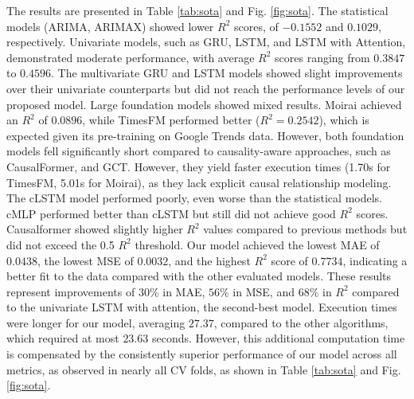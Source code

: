 \documentclass[acmsmall]{acmart}
\begin{document}
The results are presented in Table \ref{tab:sota} and Fig. \ref{fig:sota}. The statistical models (ARIMA, ARIMAX) showed lower $R^2$ scores, of $-0.1552$ and $0.1029$, respectively. Univariate models, such as GRU, LSTM, and LSTM with Attention, demonstrated moderate performance, with average $R^2$ scores ranging from $0.3847$ to $0.4596$. The multivariate GRU and LSTM models showed slight improvements over their univariate counterparts but did not reach the performance levels of our proposed model. {\color{black}Large foundation models showed mixed results. Moirai achieved an $R^2$ of $0.0896$, while TimesFM performed better ($R^2=0.2542$), which is expected given its pre-training on Google Trends data. However, both foundation models fell significantly short compared to causality-aware approaches, such as CausalFormer, and GCT. However, they yield faster execution times (1.70s for TimesFM, 5.01s for Moirai), as they lack explicit causal relationship 
modeling.} The cLSTM model performed poorly, even worse than the statistical models. cMLP performed better than cLSTM but still did not achieve good $R^2$ scores. Causalformer showed slightly higher $R^2$ values compared to previous methods but did not exceed the 0.5 $R^2$ threshold. Our model achieved the lowest MAE of $0.0438$, the lowest MSE of $0.0032$, and the highest $R^2$ score of $0.7734$, indicating a better fit to the data compared with the other evaluated models. These results represent improvements of $30\%$ in MAE, $56\%$ in MSE, and $68\%$ in $R^2$ compared to the univariate LSTM with attention, the second-best model. Execution times were longer for our model,  averaging $27.37$, compared to the other algorithms, which required at most $23.63$ seconds. However, this additional computation time is compensated by the consistently superior performance of our model across all metrics, as observed in nearly all CV folds, as shown in Table \ref{tab:sota} and Fig. \ref{fig:sota}.
\end{document}
